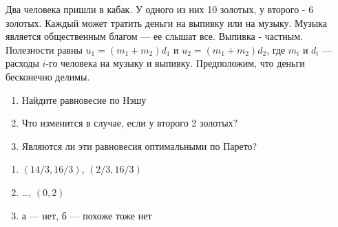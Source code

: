 \begin{problem}
 Два человека пришли в кабак. У одного из них 10 золотых, у второго
- 6 золотых. Каждый может тратить деньги на выпивку или на музыку.
Музыка является общественным благом --- ее слышат все. Выпивка -
частным. Полезности равны $u_{1}=(m_{1}+m_{2})d_{1}$ и
$u_{2}=(m_{1}+m_{2})d_{2}$, где $m_{i}$ и $d_{i}$ --- расходы $i$-го
человека на музыку и выпивку. Предположим, что деньги бесконечно
делимы. \par
\begin{enumerate}
\item Найдите равновесие по Нэшу \par
\item Что изменится в случае, если у второго 2 золотых? \par
\item  Являются ли эти равновесия оптимальными по Парето?
\end{enumerate}


\begin{sol}
\begin{enumerate}
\item $(14/3,16/3)$, $(2/3,16/3)$ \par
\item \ldots, $(0,2)$ \par
\item  а --- нет, б --- похоже тоже нет
\end{enumerate}
\end{sol}
\end{problem}



